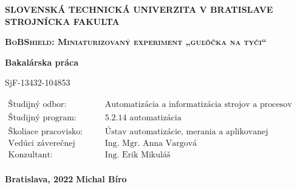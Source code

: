 \thispagestyle{empty}

\noindent \begin{center}
	\textbf{{\large{}SLOVENSKÁ TECHNICKÁ UNIVERZITA V BRATISLAVE}}\\
	\textbf{{\large{}STROJNÍCKA FAKULTA}}\textbf{\large{} }\\
	\vspace{3cm}
	\par\end{center}

\noindent \begin{center}
	\vspace{3cm}
	\par\end{center}



\begin{center}
	\textbf{\textsc{\Large{}BoBShield: Miniaturizovaný experiment „guľôčka na tyči“}}\\
	\par\end{center}{\Large \par}

\begin{center}
	\textbf{\large{}Bakalárska práca}\\
	\par\end{center}{\large \par}

\begin{center}
	{\large{}SjF-13432-104853}\\
\end{center}


\vfill
\begin{flushleft}
	$\begin{array}{ll}
		\text{Študijný odbor:}&\text{Automatizácia a informatizácia strojov a procesov}\\
		\text{Študijný program:}&\text{5.2.14 automatizácia}\\
		\text{Školiace pracovisko:}&\text{Ústav automatizácie, merania a aplikovanej informatiky}\\
		\text{Vedúci záverečnej práce:}&\text{Ing. Mgr. Anna Vargová}\\
		\text{Konzultant:}&\text{Ing. Erik Mikuláš}\\
	\end{array}$
\end{flushleft}
\vspace{0.5cm}
\noindent \textbf{\large{}Bratislava, 2022} \hfill \textbf{\large{}Michal Bíro}
\cleardoublepage